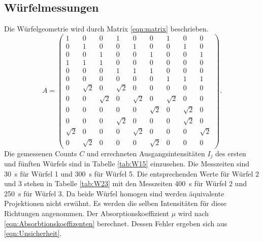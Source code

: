 \subsection{Würfelmessungen}
Die Würfelgeometrie wird durch Matrix \eqref{eqn:matrix} beschrieben.
\begin{equation*}
    A = \begin{pmatrix}
               1 & 0 & 0 & 1 & 0 & 0 & 1 & 0 & 0 \\
               0 & 1 & 0 & 0 & 1 & 0 & 0 & 1 & 0 \\
               0 & 0 & 1 & 0 & 0 & 1 & 0 & 0 & 1 \\
               1 & 1 & 1 & 0 & 0 & 0 & 0 & 0 & 0 \\
               0 & 0 & 0 & 1 & 1 & 1 & 0 & 0 & 0 \\
               0 & 0 & 0 & 0 & 0 & 0 & 1 & 1 & 1 \\
               0 & \sqrt{2} & 0 & \sqrt{2} & 0 & 0 & 0 & 0 & 0 \\
               0 & 0 & \sqrt{2} & 0 & \sqrt{2} & 0 & \sqrt{2} & 0 & 0 \\
               0 & 0 & 0 & 0 & 0 & \sqrt{2} & 0 & \sqrt{2} & 0 \\
               0 & 0 & 0 & \sqrt{2} & 0 & 0 & 0 & \sqrt{2} & 0 \\
               \sqrt{2} & 0 & 0 & 0 & \sqrt{2} & 0 & 0 & 0 & \sqrt{2} \\
               0 & \sqrt{2} & 0 & 0 & 0 & \sqrt{2} & 0 & 0 & 0
       \end{pmatrix}.
       \label{eqn:matrix}
  \end{equation*}
Die gemessenen Counts $C$ und errechneten Ausgangsintensitäten $I_j$ des ersten und fünften Würfels sind in Tabelle \ref{tab:W15} einzusehen.
Die Messzeiten sind \SI{30}{\second} für Würfel 1 und \SI{300}{\second} für Würfel 5.
Die entsprechenden Werte für Würfel 2 und 3 stehen in Tabelle \ref{tab:W23} mit den Messzeiten \SI{400}{\second} für Würfel 2 und \SI{250}{\second} für Würfel 3.
Da beide Würfel homogen sind werden äquivalente Projektionen nicht erwähnt.
Es werden die selben Intensitäten für diese Richtungen angenommen.
Der Absorptionskoeffizient $\mu$ wird nach \eqref{eqn:Absorbtionskoeffizenten} berechnet.
Dessen Fehler ergeben sich aus \eqref{eqn:Unsicherheit}.
